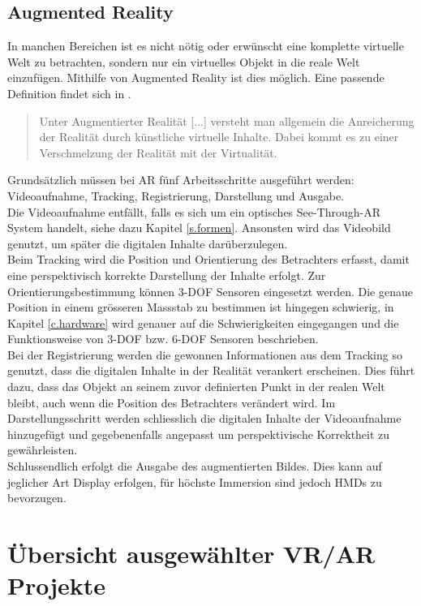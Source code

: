 \section{Augmented Reality}
In manchen Bereichen ist es nicht nötig oder erwünscht eine komplette virtuelle Welt zu betrachten, sondern nur ein virtuelles Objekt in die reale Welt einzufügen. Mithilfe von Augmented Reality ist dies möglich. Eine passende Definition findet sich in \cite{doerner13}.
\begin{quote}
Unter Augmentierter Realität [...] versteht man allgemein die Anreicherung der Realität durch künstliche virtuelle Inhalte. Dabei kommt es zu einer Verschmelzung der Realität mit der Virtualität.
\end{quote}
Grundsätzlich müssen bei AR fünf Arbeitsschritte ausgeführt werden: Videoaufnahme, Tracking, Registrierung, Darstellung und Ausgabe.\\[6pt]  
Die Videoaufnahme entfällt, falls es sich um ein optisches See-Through-AR System handelt, siehe dazu Kapitel \ref{s.formen}. Ansonsten wird das Videobild genutzt, um später die digitalen Inhalte darüberzulegen.\\[6pt]   
Beim Tracking wird die Position und Orientierung des Betrachters erfasst, damit eine perspektivisch korrekte Darstellung der Inhalte erfolgt. Zur Orientierungsbestimmung können 3-DOF Sensoren eingesetzt werden. Die genaue Position in einem grösseren Massstab zu bestimmen ist hingegen schwierig, in Kapitel \ref{c.hardware} wird genauer auf die Schwierigkeiten eingegangen und die Funktionsweise von 3-DOF bzw. 6-DOF Sensoren beschrieben.\\[6pt]  
 Bei der Registrierung werden die gewonnen Informationen aus dem Tracking so genutzt, dass die digitalen Inhalte in der Realität verankert erscheinen. Dies führt dazu, dass das Objekt an seinem zuvor definierten Punkt in der realen Welt bleibt, auch wenn die Position des Betrachters verändert wird. 
 Im Darstellungsschritt werden schliesslich die digitalen Inhalte der Videoaufnahme hinzugefügt und gegebenenfalls angepasst um perspektivische Korrektheit zu gewährleisten.\\[6pt]  
 Schlussendlich erfolgt die Ausgabe des augmentierten Bildes. Dies kann auf jeglicher Art Display erfolgen, für höchste Immersion sind jedoch HMDs zu bevorzugen.\cite[S.~241~ff.]{doerner13}

\chapter{Übersicht ausgewählter VR/AR Projekte}\label{c.projects}
\vspace{-20pt}
